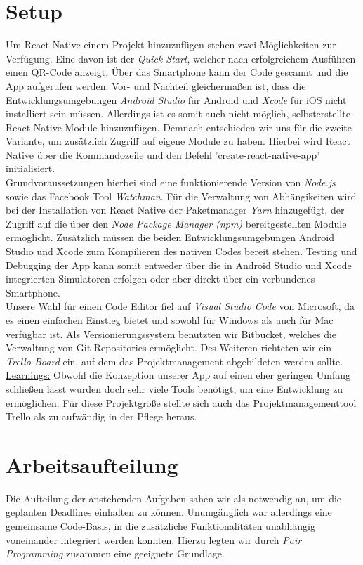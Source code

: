 \section{Setup}
Um React Native einem Projekt hinzuzufügen stehen zwei Möglichkeiten zur Verfügung.
Eine davon ist der \emph{Quick Start}, welcher nach erfolgreichem Ausführen einen QR-Code anzeigt.
Über das Smartphone kann der Code gescannt und die App aufgerufen werden.
Vor- und Nachteil gleichermaßen ist, dass die Entwicklungsumgebungen \emph{Android Studio} für Android und \emph{Xcode} für iOS nicht installiert sein müssen.
Allerdings ist es somit auch nicht möglich, selbsterstellte React Native Module hinzuzufügen.
Demnach entschieden wir uns für die zweite Variante, um zusätzlich Zugriff auf eigene Module zu haben.
Hierbei wird React Native über die Kommandozeile und den Befehl 'create-react-native-app' initialisiert.
\\
Grundvoraussetzungen hierbei sind eine funktionierende Version von \emph{Node.js} sowie das Facebook Tool \emph{Watchman}.
Für die Verwaltung von Abhängikeiten wird bei der Installation von React Native der Paketmanager \emph{Yarn} hinzugefügt, der Zugriff auf die über den \emph{Node Package Manager (npm)} bereitgestellten Module ermöglicht.
Zusätzlich müssen die beiden Entwicklungsumgebungen Android Studio und Xcode zum Kompilieren des nativen Codes bereit stehen.
Testing und Debugging der App kann somit entweder über die in Android Studio und Xcode integrierten Simulatoren erfolgen oder aber direkt über ein verbundenes Smartphone.
\\
Unsere Wahl für einen Code Editor fiel auf \emph{Visual Studio Code} von Microsoft, da es einen einfachen Einstieg bietet und sowohl für Windows als auch für Mac verfügbar ist.
Als Versionierungssystem benutzten wir Bitbucket, welches die Verwaltung von Git-Repositories ermöglicht.
Des Weiteren richteten wir ein \emph{Trello-Board} ein, auf dem das Projektmanagement abgebildeten werden sollte.
\\
\underline{Learnings:}
Obwohl die Konzeption unserer App auf einen eher geringen Umfang schließen lässt wurden doch sehr viele Tools benötigt, um eine Entwicklung zu ermöglichen.
Für diese Projektgröße stellte sich auch das Projektmanagementtool Trello als zu aufwändig in der Pflege heraus.



\section{Arbeitsaufteilung}
Die Aufteilung der anstehenden Aufgaben sahen wir als notwendig an, um die geplanten Deadlines einhalten zu können.
Unumgänglich war allerdings eine gemeinsame Code-Basis, in die zusätzliche Funktionalitäten unabhängig voneinander integriert werden konnten.
Hierzu legten wir durch \emph{Pair Programming} zusammen eine geeignete Grundlage.

